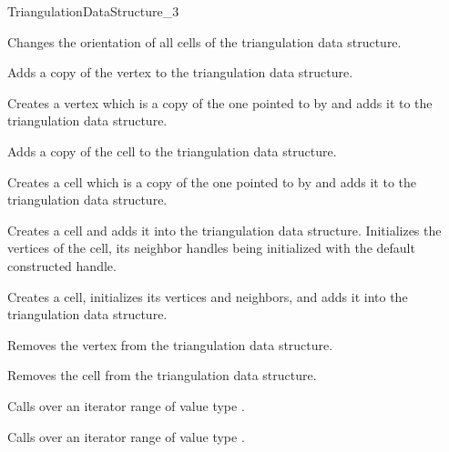 \begin{ccRefConcept}{TriangulationDataStructure_3}
\begin{ccAdvanced}
{Changes the orientation of all cells of the triangulation data structure.
}

{Adds a copy of the vertex  to the triangulation data structure.}

{Creates a vertex which is a copy of the one pointed to by 
and adds it to the triangulation data structure.}

{Adds a copy of the cell  to the triangulation data structure.}

{Creates a cell which is a copy of the one pointed to by 
and adds it to the triangulation data structure.}

{Creates a cell and adds it into the triangulation data
structure. Initializes the vertices of the cell, its neighbor handles
being initialized with the default constructed handle.}

{Creates a cell, initializes its vertices and neighbors, and adds it
into the triangulation data structure.}

{Removes the vertex from the triangulation data structure.
}

{Removes the cell from the triangulation data structure.
}

{Calls  over an iterator range of value type
.}

{Calls  over an iterator range of value type
.}

\end{ccAdvanced}


\end{ccRefConcept}
